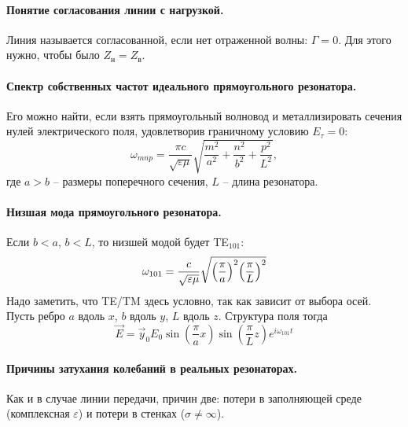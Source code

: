 \documentclass[a4paper,14pt]{extarticle}
\begin{document}
\paragraph{Понятие согласования линии с нагрузкой. } Линия называется согласованной, если нет отраженной волны: $\Gamma=0$. Для этого нужно, чтобы было $Z_\text{н}=Z_\text{в}$.





\paragraph{Спектр собственных частот идеального прямоугольного резонатора.} Его можно найти, если взять прямоугольный волновод и металлизировать сечения нулей электрического поля, удовлетворив граничному условию $E_\tau=0$:
\begin{equation}
	\omega_{mnp} = \frac{\pi c}{\sqrt{\varepsilon \mu}} \sqrt{\frac{m^2}{a^2}+\frac{n^2}{b^2}+\frac{p^2}{L^2}},
\end{equation}
где $a>b$ -- размеры поперечного сечения, $L$ -- длина резонатора.
\paragraph{Низшая мода прямоугольного резонатора. }%
Если $b<a$, $b<L$, то низшей модой будет TE${}_{101}$:
\begin{equation}
	\omega_{101}=\frac{c}{\sqrt{\varepsilon \mu}}\sqrt{
		\qty(\frac{\pi}{a})^2
		\qty(\frac{\pi}{L})^2
	}
\end{equation}
Надо заметить, что TE/TM здесь условно, так как зависит от выбора осей. Пусть ребро $a$ вдоль $x$, $b$ вдоль $y$, $L$ вдоль $z$.  Структура поля тогда 
\begin{equation}
	\vec{E}=\vec{y}_0 E_0 \sin(\frac{\pi}{a}x)\sin(\frac{\pi}{L}z)e^{i\omega_{101}t}
\end{equation}









\paragraph{Причины затухания колебаний в реальных резонаторах.} Как и в случае линии передачи, причин две:
потери в заполняющей среде (комплексная $\varepsilon$) и потери в стенках ($\sigma \ne \infty$).
\end{document}
